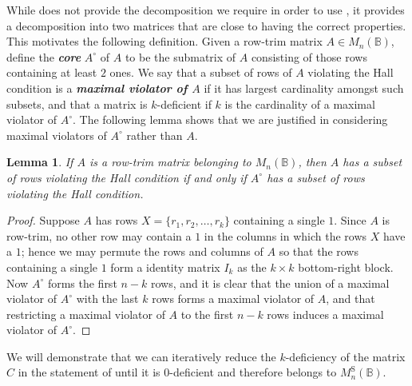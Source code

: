 \documentclass[11pt]{article}
\newtheorem{lemma}[thm]{Lemma}
\newcommand{\defn}[1]{\textbf{\textit{#1}}}
\numberwithin{equation}{section}
\newcommand{\B}{\mathbb{B}}
\newcommand{\Bn}{M_n(\B)}
\newcommand{\Halln}{M_n^{\text{S}}(\B)}
\begin{document}
While  does not provide the decomposition we
require in order to use , it provides a
decomposition into two matrices that are close to having the correct properties.
This motivates the following definition. Given a row-trim matrix $A \in \Bn$,
define the \defn{core} $A^\circ$ of $A$ to be the submatrix of $A$ consisting of
those rows containing at least $2$ ones. We say that a subset of rows of $A$
violating the Hall condition is a \defn{maximal violator of $A$} if it has
largest cardinality amongst such subsets, and that a matrix is $k$-deficient if
$k$ is the cardinality of a maximal violator of $A^\circ$. The following lemma
shows that we are justified in considering maximal violators of $A^\circ$ rather
than $A$. 

\begin{lemma}
  If $A$ is a row-trim matrix belonging to $\Bn$, then $A$ has a subset of rows
  violating the Hall condition if and only if $A^\circ$ has a subset of rows
  violating the Hall condition.
\end{lemma}
\begin{proof}
  Suppose $A$ has rows $X = \{r_1, r_2, \ldots, r_k\}$ containing a single $1$.
  Since $A$ is row-trim, no other row may contain a $1$ in the columns in which
  the rows $X$ have a $1$; hence we may permute the rows and columns of $A$ so
  that the rows containing a single $1$ form a identity matrix $I_k$ as the $k
  \times k$ bottom-right block. Now $A^\circ$ forms the first $n-k$ rows, and it
  is clear that the union of a maximal violator of $A^\circ$ with the last $k$
  rows forms a maximal violator of $A$, and that restricting a maximal violator
  of $A$ to the first $n-k$ rows induces a maximal violator of $A^\circ$.
\end{proof}

We will demonstrate that we can iteratively reduce the $k$-deficiency of the
matrix $C$ in the statement of  until it is
$0$-deficient and therefore belongs to $\Halln$.
\end{document}
